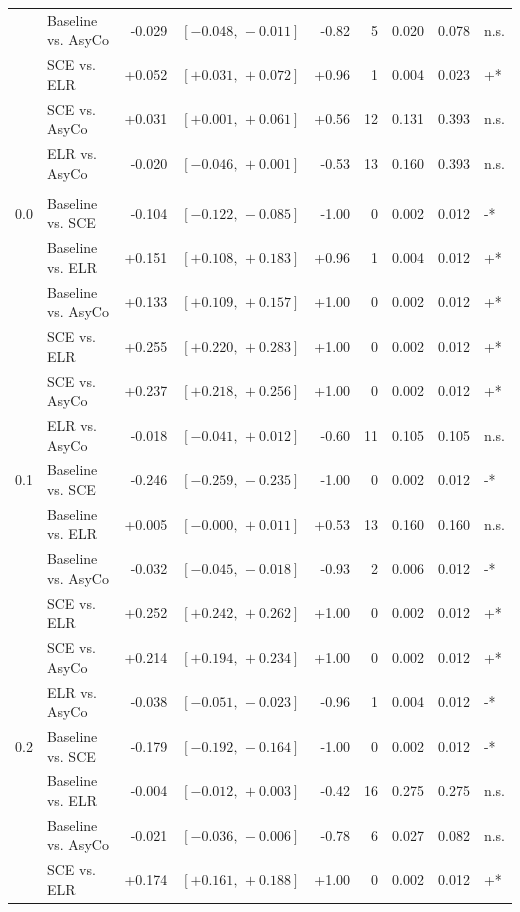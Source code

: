 \begin{small}
\begin{longtable}{llrrrrrrl}
 & Baseline vs. AsyCo & -0.029 & $[-0.048,\,-0.011]$ & -0.82 & 5 & 0.020 & 0.078 & n.s. \\
 & SCE vs. ELR & +0.052 & $[+0.031,\,+0.072]$ & +0.96 & 1 & 0.004 & 0.023 & +* \\
 & SCE vs. AsyCo & +0.031 & $[+0.001,\,+0.061]$ & +0.56 & 12 & 0.131 & 0.393 & n.s. \\
 & ELR vs. AsyCo & -0.020 & $[-0.046,\,+0.001]$ & -0.53 & 13 & 0.160 & 0.393 & n.s. \\
\addlinespace
\multicolumn{9}{l}{\textit{Macro F1}} \\
0.0 & Baseline vs. SCE & -0.104 & $[-0.122,\,-0.085]$ & -1.00 & 0 & 0.002 & 0.012 & -* \\
 & Baseline vs. ELR & +0.151 & $[+0.108,\,+0.183]$ & +0.96 & 1 & 0.004 & 0.012 & +* \\
 & Baseline vs. AsyCo & +0.133 & $[+0.109,\,+0.157]$ & +1.00 & 0 & 0.002 & 0.012 & +* \\
 & SCE vs. ELR & +0.255 & $[+0.220,\,+0.283]$ & +1.00 & 0 & 0.002 & 0.012 & +* \\
 & SCE vs. AsyCo & +0.237 & $[+0.218,\,+0.256]$ & +1.00 & 0 & 0.002 & 0.012 & +* \\
 & ELR vs. AsyCo & -0.018 & $[-0.041,\,+0.012]$ & -0.60 & 11 & 0.105 & 0.105 & n.s. \\
0.1 & Baseline vs. SCE & -0.246 & $[-0.259,\,-0.235]$ & -1.00 & 0 & 0.002 & 0.012 & -* \\
 & Baseline vs. ELR & +0.005 & $[-0.000,\,+0.011]$ & +0.53 & 13 & 0.160 & 0.160 & n.s. \\
 & Baseline vs. AsyCo & -0.032 & $[-0.045,\,-0.018]$ & -0.93 & 2 & 0.006 & 0.012 & -* \\
 & SCE vs. ELR & +0.252 & $[+0.242,\,+0.262]$ & +1.00 & 0 & 0.002 & 0.012 & +* \\
 & SCE vs. AsyCo & +0.214 & $[+0.194,\,+0.234]$ & +1.00 & 0 & 0.002 & 0.012 & +* \\
 & ELR vs. AsyCo & -0.038 & $[-0.051,\,-0.023]$ & -0.96 & 1 & 0.004 & 0.012 & -* \\
0.2 & Baseline vs. SCE & -0.179 & $[-0.192,\,-0.164]$ & -1.00 & 0 & 0.002 & 0.012 & -* \\
 & Baseline vs. ELR & -0.004 & $[-0.012,\,+0.003]$ & -0.42 & 16 & 0.275 & 0.275 & n.s. \\
 & Baseline vs. AsyCo & -0.021 & $[-0.036,\,-0.006]$ & -0.78 & 6 & 0.027 & 0.082 & n.s. \\
 & SCE vs. ELR & +0.174 & $[+0.161,\,+0.188]$ & +1.00 & 0 & 0.002 & 0.012 & +* \\

\end{longtable}
\end{small}
